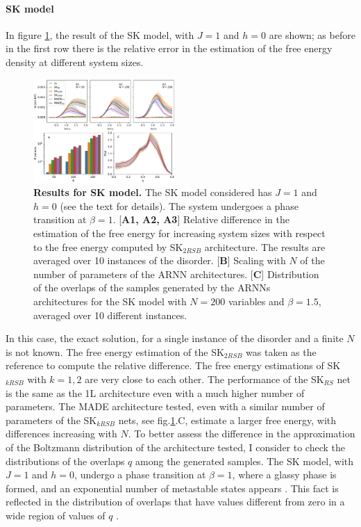 \documentclass[aps,physrev,10pt,floatfix,reprint]{revtex4-2}
\begin{document}
\paragraph{SK model}
In figure \ref{fig:SK}, the result of the SK model, with $J=1$ and $h=0$ are shown; as before in the first row there is the relative error in the estimation of the free energy density at different system sizes. 
\begin{figure}[h]
    \centering 
    \includegraphics[width=0.48\textwidth]{img/SK_res.pdf}
    \caption{\textbf{Results for SK model.} The SK model considered has $J=1$ and $h=0$ (see the text for details). The system undergoes a phase transition at $\beta=1$\cite{10.1142/0271}. [\textbf{A1, A2, A3}] Relative difference in the estimation of the free energy for increasing system sizes with respect to the free energy computed by SK$_{2RSB}$ architecture. The results are averaged over 10 instances of the disorder. [\textbf{B}] Scaling with $N$ of the number of parameters of the ARNN architectures. [\textbf{C}] Distribution of the overlaps of the samples generated by the ARNNs architectures for the SK model with $N=200$ variables and $\beta=1.5$, averaged over 10 different instances.}
    \label{fig:SK}
\end{figure}
In this case, the exact solution, for a single instance of the disorder and a finite $N$ is not known. The free energy estimation of the SK$_{2RSB}$ was taken as the reference to compute the relative difference. The free energy estimations of SK$_{kRSB}$ with $k=1,2$ are very close to each other.
The performance of the SK$_{RS}$ net is the same as the 1L architecture even with a much higher number of parameters. The MADE architecture tested, even with a similar number of parameters of the SK$_{kRSB}$ nets, see fig.\ref{fig:SK}.C, estimate a larger free energy, with differences increasing with $N$.
To better assess the difference in the approximation of the Boltzmann distribution of the architecture tested, I consider to check the distributions of the overlaps $q$ among the generated samples. The SK model, with $J=1$ and $h=0$, undergo a phase transition at $\beta=1$, where a glassy phase is formed, and an exponential number of metastable states appears \cite{10.1142/0271}. This fact is reflected in the distribution of overlaps that have values different from zero in a wide region of values of $q$ \cite{PhysRevLett.51.1206}.
\end{document}
